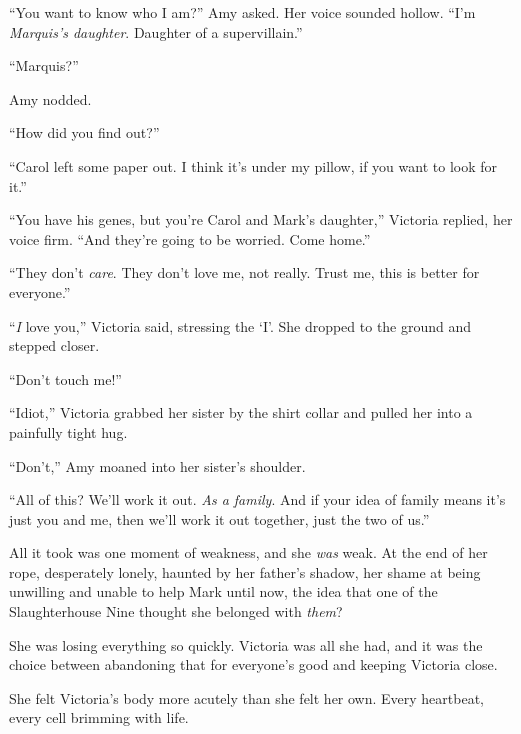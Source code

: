 ``You want to know who I am?'' Amy asked.  Her voice sounded hollow.  ``I'm \emph{Marquis's daughter}.  Daughter of a supervillain.''



``Marquis?''



Amy nodded.



``How did you find out?''



``Carol left some paper out.  I think it's under my pillow, if you want to look for it.''



``You have his genes, but you're Carol and Mark's daughter,'' Victoria replied, her voice firm.  ``And they're going to be worried.  Come home.''



``They don't \emph{care}.  They don't love me, not really.  Trust me, this is better for everyone.''



``\emph{I} love you,'' Victoria said, stressing the `I'.  She dropped to the ground and stepped closer.



``Don't touch me!''



``Idiot,'' Victoria grabbed her sister by the shirt collar and pulled her into a painfully tight hug.



``Don't,'' Amy moaned into her sister's shoulder.



``All of this?  We'll work it out.  \emph{As a family}.  And if your idea of family means it's just you and me, then we'll work it out together, just the two of us.''



All it took was one moment of weakness, and she \emph{was} weak.  At the end of her rope, desperately lonely, haunted by her father's shadow, her shame at being unwilling and unable to help Mark until now, the idea that one of the Slaughterhouse Nine thought she belonged with \emph{them}?



She was losing everything so quickly.  Victoria was all she had, and it was the choice between abandoning that for everyone's good and keeping Victoria close.



She felt Victoria's body more acutely than she felt her own.  Every heartbeat, every cell brimming with life.



